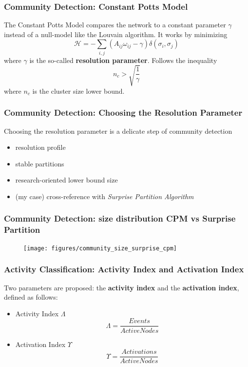 \documentclass{beamer}
\begin{document}

\begin{frame}
\frametitle{Community Detection: Constant Potts Model}
The Constant Potts Model compares the network to a constant parameter $\gamma$ instead of a null-model like the Louvain algorithm. It works by minimizing  \\
$$\mathcal{H} = - \sum_{i,j}(A_{ij}\omega_{ij}-\gamma)\delta(\sigma_{i},\sigma_{j})$$
where $\gamma$ is the so-called \textbf{resolution parameter}. Follows the inequality $$n_{c} > \sqrt{\frac{1}{\gamma}}$$ where $n_{c}$ is the cluster size lower bound.
\end{frame}


\begin{frame}
\frametitle{Community Detection: Choosing the Resolution Parameter}
Choosing the resolution parameter is a delicate step of community detection
\begin{itemize}
	\item resolution profile
	\item stable partitions
	\item research-oriented lower bound size 
	\item (my case) cross-reference with \textit{Surprise Partition Algorithm}\footnotemark
\end{itemize}


\end{frame}


\begin{frame}
\frametitle{Community Detection: size distribution CPM vs Surprise Partition}
\begin{figure}
	\texttt{[image: figures/community\_size\_surprise\_cpm]}
\end{figure}
\end{frame}


\begin{frame}
\frametitle{Activity Classification: Activity Index and Activation Index}
Two parameters are proposed: the \textbf{activity index} and the \textbf{activation index}, defined as follows:
\begin{itemize}
	\item Activity Index $\Lambda$  \\ $$\Lambda = \frac{Events}{ActiveNodes}$$
	\item Activation Index $\Upsilon$  \\ $$\Upsilon = \frac{Activations}{ActiveNodes}$$
\end{itemize}
\end{frame}
\end{document}
